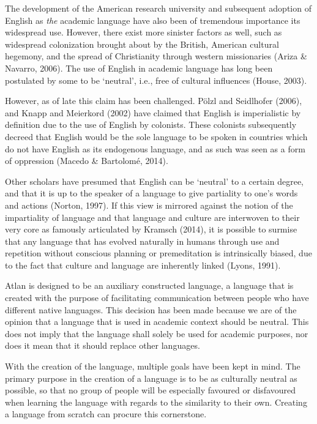 The development of the American research university and subsequent adoption of English as \textit{the} academic language have also been of tremendous importance its widespread use. However, there exist more sinister factors as well, such as widespread colonization brought about by the British, American cultural hegemony, and the spread of Christianity through western missionaries (Ariza \& Navarro, 2006). The use of English in academic language has long been postulated by some to be ‘neutral’, i.e., free of cultural influences (House, 2003). 

However, as of late this claim has been challenged. Pölzl and Seidlhofer (2006), and Knapp and Meierkord (2002) have claimed that English is imperialistic by definition due to the use of English by colonists. These colonists subsequently decreed that English would be the sole language to be spoken in countries which do not have English as its endogenous language, and as such was seen as a form of oppression (Macedo \& Bartolomé, 2014).

Other scholars have presumed that English can be ‘neutral’ to a certain degree, and that it is up to the speaker of a language to give partiality to one’s words and actions (Norton, 1997). If this view is mirrored against the notion of the impartiality of language and that language and culture are interwoven to their very core as famously articulated by Kramsch (2014), it is possible to surmise that any language that has evolved naturally in humans through use and repetition without conscious planning or premeditation is intrinsically biased, due to the fact that culture and language are inherently linked (Lyons, 1991). 

Atlan is designed to be an auxiliary constructed language, a language that is created with the purpose of facilitating communication between people who have different native languages. This decision has been made because we are of the opinion that a language that is used in academic context should be neutral. This does not imply that the language shall solely be used for academic purposes, nor does it mean that it should replace other languages. 

With the creation of the language, multiple goals have been kept in mind. The primary purpose in the creation of a language is to be as culturally neutral as possible, so that no group of people will be especially favoured or disfavoured when learning the language with regards to the similarity to their own. Creating a language from scratch can procure this cornerstone. 


